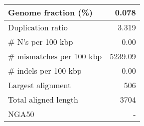 \documentclass[12pt,a4paper]{article}
\begin{document}
\begin{table}[ht]
\begin{center}
\begin{tabular}{|l*{1}{|r}|}
Genome fraction (\%) & 0.078 \\ \hline
Duplication ratio & 3.319 \\ \hline
\# N's per 100 kbp & 0.00 \\ \hline
\# mismatches per 100 kbp & 5239.09 \\ \hline
\# indels per 100 kbp & 0.00 \\ \hline
Largest alignment & 506 \\ \hline
Total aligned length & 3704 \\ \hline
NGA50 & - \\ \hline
\end{tabular}
\end{center}
\end{table}
\end{document}
